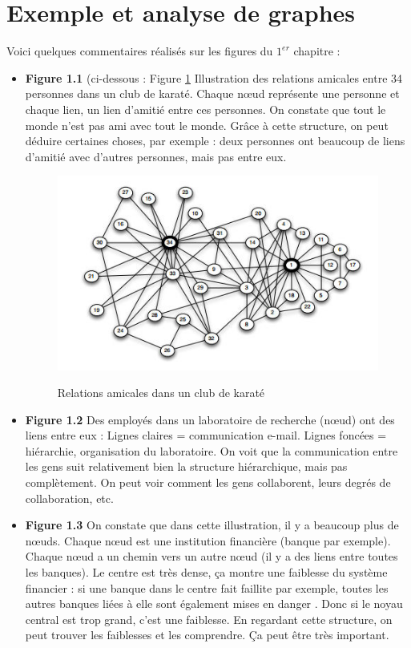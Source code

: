 \section{Exemple et analyse de graphes}
Voici quelques commentaires réalisés sur les figures du $1^{er}$ chapitre :
\begin{itemize}

	\item \textbf{Figure 1.1} (ci-dessous : Figure \ref{karate} Illustration des relations amicales entre 34 personnes dans un club de karaté.
Chaque nœud représente une personne et chaque lien, un lien d'amitié entre ces personnes.
On constate que tout le monde n'est pas ami avec tout le monde. Grâce à cette structure, on peut déduire certaines choses, par exemple : deux personnes ont beaucoup de liens d'amitié avec d'autres personnes, mais pas entre eux.\\
\begin{figure}[!h]
\centering
\includegraphics[scale=1]{images/17_karate_club.jpg}
\label{karate}
\caption{Relations amicales dans un club de karaté}
\end{figure}

	\item \textbf{Figure 1.2} Des employés dans un laboratoire de recherche (nœud) ont des liens entre eux :
Lignes claires = communication e-mail.
Lignes foncées = hiérarchie, organisation du laboratoire.
On voit que la communication entre les gens suit relativement bien la structure hiérarchique, mais pas complètement. On peut voir comment les gens collaborent, leurs degrés de collaboration, etc. \\

	\item \textbf{Figure 1.3} On constate que dans cette illustration, il y a beaucoup plus de nœuds. Chaque nœud est une institution financière (banque par exemple). Chaque nœud a un chemin vers un autre nœud (il y a des liens entre toutes les banques). Le centre est très dense, ça montre une faiblesse du système financier : si une banque dans le centre fait faillite par exemple, toutes les autres banques liées à elle sont également mises en danger . Donc si le noyau central est trop grand, c'est une faiblesse. En regardant cette structure, on peut trouver les faiblesses et les comprendre. Ça peut être très important.\\


\end{itemize}
